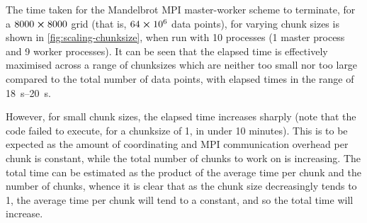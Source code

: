 \documentclass{article}
\begin{document}
The time taken for the Mandelbrot MPI master-worker scheme to terminate, for a
$8000 \cross 8000$ grid (that is, $64 \cross 10^{6}$ data points), for varying
chunk sizes is shown in \autoref{fig:scaling-chunksize}, when run with 10
processes (1 master process and 9 worker processes).
It can be seen that the elapsed time is effectively maximised across a range of
chunksizes which are neither too small nor too large compared to the total
number of data points, with elapsed times in the range of
\SIrange{18}{20}{\second}.

However, for small chunk sizes, the elapsed time increases sharply (note that
the code failed to execute, for a chunksize of 1, in under 10 minutes).
This is to be expected as the amount of coordinating and MPI communication
overhead per chunk is constant, while the total number of chunks to work on is
increasing.
The total time can be estimated as the product of the average time per chunk and
the number of chunks, whence it is clear that as the chunk size decreasingly
tends to 1, the average time per chunk will tend to a constant, and so the total
time will increase.
\end{document}
